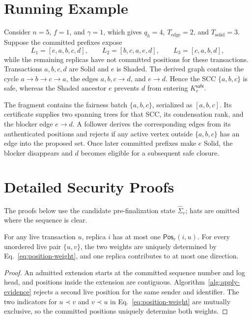 \section{Running Example}
\label{app:running-example}

Consider $n=5$, $f=1$, and $\gamma=1$, which gives $q_h=4$,
$T_{\mathrm{edge}}=2$, and $T_{\mathrm{solid}}=3$.  Suppose the committed prefixes expose
\[
 L_1=[e,a,b,c,d],\qquad
 L_2=[b,c,a,e,d],\qquad
 L_3=[c,a,b,d],
\]
while the remaining replicas have not committed positions for these transactions.  Transactions $a,b,c,d$ are Solid and $e$ is Shaded.  The derived graph contains the cycle $a\to b\to c\to a$, the edges $a,b,c\to d$, and $e\to d$.  Hence the SCC $\{a,b,c\}$ is safe, whereas the Shaded ancestor $e$ prevents $d$ from entering $K_r^{\mathsf{safe}}$.

The fragment contains the fairness batch $\{a,b,c\}$, serialized as $[a,b,c]$.  Its certificate supplies two spanning trees for that SCC, its condensation rank, and the blocker edge $e\to d$.  A follower derives the corresponding edges from its authenticated positions and rejects if any active vertex outside $\{a,b,c\}$ has an edge into the proposed set.  Once later committed prefixes make $e$ Solid, the blocker disappears and $d$ becomes eligible for a subsequent safe closure.

\section{Detailed Security Proofs}
\label{app:autig-security-details}

The proofs below use the candidate pre-finalization state
$\widehat\Sigma_r$; hats are omitted where the sequence is clear.

\begin{lemma}
\label{lem:position-uniqueness}
For any live transaction $u$, replica $i$ has at most one
$\mathsf{Pos}_r(i,u)$.  For every unordered live pair $\{u,v\}$, the two
weights are uniquely determined by Eq.~\eqref{eq:position-weight}, and one
replica contributes to at most one direction.
\end{lemma}

\begin{proof}
An admitted extension starts at the committed sequence number and log head,
and positions inside the extension are contiguous.  Algorithm~\ref{alg:apply-evidence}
rejects a second live position for the same sender and identifier.  The two
indicators for $u\prec v$ and $v\prec u$ in Eq.~\eqref{eq:position-weight}
are mutually exclusive, so the committed positions uniquely determine both
weights.
\end{proof}

